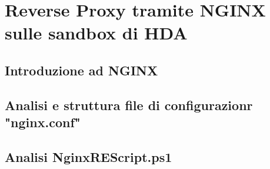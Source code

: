 
\chapter{Reverse Proxy tramite NGINX sulle sandbox di HDA}
\label{cap:nginx-reverse-proxy}

\section{Introduzione ad NGINX}

\section{Analisi e struttura file di configurazionr "nginx.conf"}

\section{Analisi NginxREScript.ps1}
